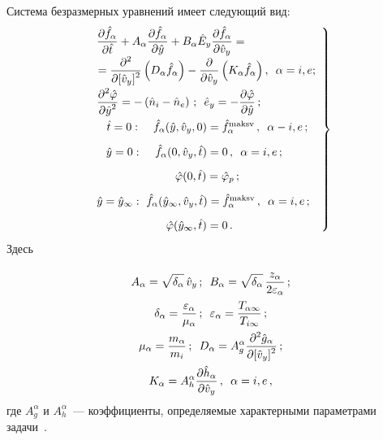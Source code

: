 \begin{multicols}{2}
Система безразмерных уравнений имеет следующий вид:
\begin{equation}
\left.
\begin{array}{l}
\fr{\partial 
\hat{f}_\alpha}{\partial\hat{t}}+A_\alpha\fr{\partial\hat{f}_\alpha}{\partial\hat{y}}+
B_\alpha\hat{E}_y\fr{\partial\hat{f}_\alpha}{\partial \hat{v}_y}={}\\
\!{}=
\fr{\partial^2}{\partial[\hat{v}_y]^2}\left(D_\alpha 
\hat{f}_\alpha\right)-\fr{\partial}{\partial\hat{v}_y}\left(K_\alpha \hat{f}_\alpha\right),\enskip 
\alpha=i,e;\\[9pt]
\fr{\partial^2\hat{\varphi}}{\partial\hat{y}^2}=-\left(\hat{n}_i-\hat{n}_e\right)\,;\enskip \hat{e}_y=-
\fr{\partial\hat\varphi}{\partial\hat{y}}\,;\\[9pt]
\hspace*{3.1mm}\hat{t}=0:\ \hspace*{2.6mm}\hat{f}_\alpha(\hat{y},\hat{v}_y,0)=\hat{f}_\alpha^{\mathrm{maksv}}\,,\enskip \alpha-i,e\,;\\[9pt]
\hspace*{2.9mm}\hat{y}=0:\ \hspace*{2.8mm}\hat{f}_\alpha(0,\hat{v}_y,\hat{t})=0\,,\enskip \alpha=i,e\,;\\[9pt]
\hspace*{24.3mm}\hat\varphi(0,\hat{t})=\hat{\varphi}_p\,;\\[9pt]
\hat{y}=\hat{y}_\infty:\ \hat{f}_\alpha(\hat{y}_\infty, \hat{v}_y, \hat{t})=\hat{f}^{\mathrm{maksv}}_\alpha\,,\enskip 
\alpha=i,e\,;\\[9pt]
\hspace*{21.5mm}\hat\varphi(\hat{y}_\infty,\hat{t})=0\,.
\end{array}
\right\}
\label{e4-k}
\end{equation}
Здесь 

\vspace*{-2pt}

\noindent
\begin{gather*}
A_\alpha=\sqrt{\delta_\alpha }\,\hat{v}_y\,;\enskip 
B_\alpha=\sqrt{\delta_\alpha}\,\displaystyle\frac{\displaystyle z_\alpha\mathstrut}{\displaystyle 2\varepsilon_\alpha\mathstrut}\,;\\
\delta_\alpha=\displaystyle\frac{\displaystyle \varepsilon_\alpha\mathstrut}{\displaystyle \mu_\alpha\mathstrut}\,;\enskip 
\varepsilon_\alpha=\displaystyle\frac{\displaystyle T_{\alpha\infty}\mathstrut}{\displaystyle T_{i\infty}\mathstrut}\,;\\
\mu_\alpha=\displaystyle\frac{\displaystyle m_\alpha\mathstrut}{\displaystyle m_i\mathstrut}\,;\enskip 
D_\alpha=A_g^\alpha\displaystyle\frac{\displaystyle \partial^2\hat{g}_\alpha\mathstrut}{\displaystyle \partial  [\hat{v}_y]^2\mathstrut}\,;\\
K_\alpha=A_h^\alpha \displaystyle\frac{\displaystyle \partial \hat{h}_\alpha\mathstrut}{\displaystyle \partial \hat{v}_y\mathstrut}\,,\enskip \alpha=i,e\,,
\end{gather*}
где $A_g^\alpha$ и $A_h^\alpha$~--- коэффициенты, определяемые характерными параметрами 
задачи~\cite{15-k}.


\end{multicols}
